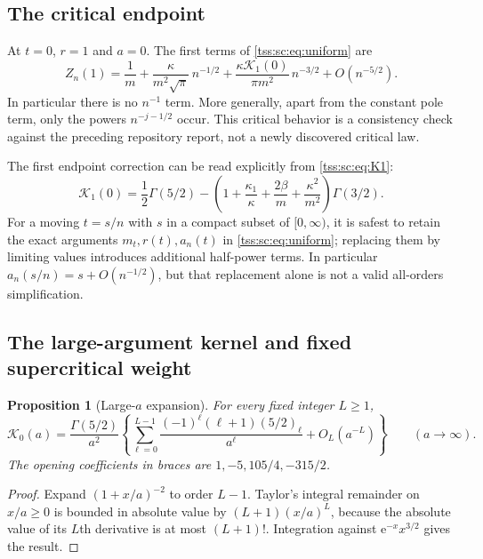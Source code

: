 \documentclass[11pt]{article}
\newtheorem{proposition}[theorem]{Proposition}
\theoremstyle{remark}\newtheorem{remark}[theorem]{Remark}
\theoremstyle{definition}\newtheorem{definition}[theorem]{Definition}
\newcommand{\e}{\mathrm e}
\newcommand{\Kc}{\mathcal K}
\begin{document}
\subsection{The critical endpoint}
At $t=0$, $r=1$ and $a=0$. The first terms of \eqref{tss:sc:eq:uniform} are
\begin{equation}\label{tss:sc:eq:critical}
 Z_n(1)=\frac1m+\frac{\kappa}{m^2\sqrt\pi}\,n^{-1/2}
           +\frac{\kappa\Kc_1(0)}{\pi m^2}\,n^{-3/2}
           +O(n^{-5/2}).
\end{equation}
In particular there is no $n^{-1}$ term. More generally, apart from the constant pole term, only the powers $n^{-j-1/2}$ occur. This critical behavior is a consistency check against the preceding repository report, not a newly discovered critical law.

The first endpoint correction can be read explicitly from \eqref{tss:sc:eq:K1}:
\begin{equation}\label{tss:sc:eq:K10}
 \Kc_1(0)=\frac12\Gamma(5/2)
 -\left(1+\frac{\kappa_1}{\kappa}+\frac{2\beta}{m}
                   +\frac{\kappa^2}{m^2}\right)\Gamma(3/2).
\end{equation}
For a moving $t=s/n$ with $s$ in a compact subset of $[0,\infty)$, it is safest to retain the exact arguments $m_t,r(t),a_n(t)$ in \eqref{tss:sc:eq:uniform}; replacing them by limiting values introduces additional half-power terms. In particular $a_n(s/n)=s+O(n^{-1/2})$, but that replacement alone is not a valid all-orders simplification.

\subsection{The large-argument kernel and fixed supercritical weight}
\begin{proposition}[Large-$a$ expansion]\label{tss:sc:prop:Klarge}
For every fixed integer $L\geq1$,
\begin{equation}\label{tss:sc:eq:Klarge}
 \Kc_0(a)=\frac{\Gamma(5/2)}{a^2}
 \left\{\sum_{\ell=0}^{L-1}
       \frac{(-1)^\ell(\ell+1)(5/2)_\ell}{a^\ell}
       +O_L(a^{-L})\right\}\qquad(a\to\infty).
\end{equation}
The opening coefficients in braces are $1,-5,105/4,-315/2$.
\end{proposition}
\begin{proof}
Expand $(1+x/a)^{-2}$ to order $L-1$. Taylor's integral remainder on $x/a\geq0$ is bounded in absolute value by $(L+1)(x/a)^L$, because the absolute value of its $L$th derivative is at most $(L+1)!$. Integration against $\e^{-x}x^{3/2}$ gives the result.
\end{proof}
\end{document}
